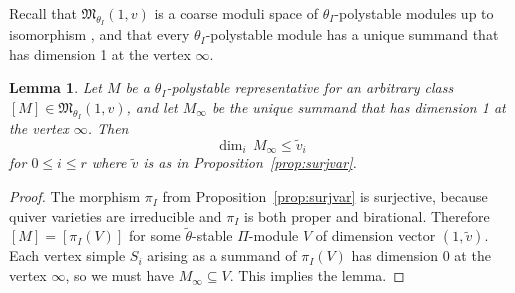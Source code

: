 \documentclass[11pt]{article}
\numberwithin{equation}{section}
\newtheorem{Lemma}[Theorem]{Lemma}
\numberwithin{equation}{section}
\begin{document}
Recall that $\mathfrak{M}_{\theta_I}(1,v)$ is a coarse moduli space of $\theta_I$-polystable modules up to
isomorphism \cite[Proposition 2.9(2)]{nakajima2009quiver}, and that every $\theta_I$-polystable module has a unique summand that has dimension 1 at the vertex $\infty$.
\begin{Lemma}
\label{lem:vwtildev}
Let $M$ be a $\theta_I$-polystable representative for an arbitrary class $[M] \in \mathfrak{M}_{\theta_I}(1,v)$, and let $M_{\infty}$ be the unique summand that has dimension 1 at the vertex $\infty$.
Then
\[ \dim_i\,M_{\infty} \leq \widetilde{v}_i\]
for $0 \leq i \leq r$ where $\widetilde{v}$ is as in Proposition~{\rm \ref{prop:surjvar}}.
\end{Lemma}
\begin{proof}
{The morphism $\pi_I$ from Proposition~\ref{prop:surjvar} is surjective, because quiver varieties are irreducible and $\pi_I$ is both proper and birational. Therefore $[M]=[\pi_I(V)]$ for some $\tilde{\theta}$-stable $\Pi$-module $V$ of dimension vector $(1,\tilde{v})$. Each vertex simple $S_i$ arising as a summand of $\pi_I(V)$} has dimension 0 at the vertex $\infty$, {so }we must have $M_{\infty} \subseteq {V}$. This implies the lemma.
\end{proof}
\end{document}
